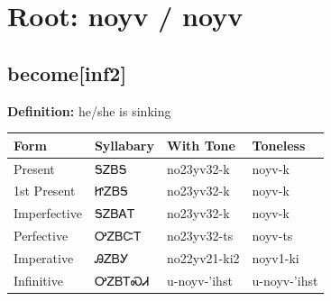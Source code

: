 \documentclass{article}%
\begin{document}
%
\normalsize%
\section*{Root: noyv / noyv}%
\subsection*{become[inf2]}%
\textbf{Definition: }%
he/she is sinking%
\\[0.5em]%
\begin{tabular}{|l|l|l|l|}%
\hline%
\textbf{Form}&\textbf{Syllabary}&\textbf{With Tone}&\textbf{Toneless}\\%
\hline%
Present&ᎦᏃᏴᎦ&no23yv32{-}k&noyv{-}k\\%
1st Present&ᏥᏃᏴᎦ&no23yv32{-}k&noyv{-}k\\%
Imperfective&ᎦᏃᏴᎪᎢ&no23yv32{-}k&noyv{-}k\\%
Perfective&ᎤᏃᏴᏨᎢ&no23yv32{-}ts&noyv{-}ts\\%
Imperative&ᎯᏃᏴᎩ&no22yv21{-}ki2&noyv1{-}ki\\%
Infinitive&ᎤᏃᏴᎢᏍᏗ&u{-}noyv{-}'ihst&u{-}noyv{-}'ihst\\%
\hline%
\end{tabular}%
\\[1em]%
\end{document}
